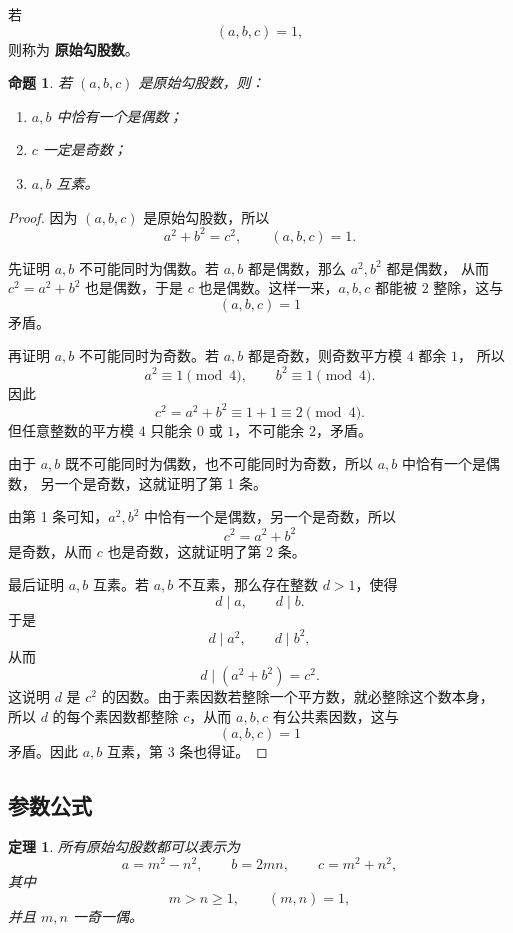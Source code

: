 \documentclass[11pt,a4paper,fontset=fandol]{ctexart}
\theoremstyle{formaltheorem}
\newtheorem{theorem}{定理}[section]
\newtheorem{proposition}{命题}[section]
\theoremstyle{formalexample}
\begin{document}
若
\[
(a,b,c)=1,
\]
则称为 \textbf{原始勾股数}。

\begin{proposition}
若 $(a,b,c)$ 是原始勾股数，则：
\begin{enumerate}
  \item $a,b$ 中恰有一个是偶数；
  \item $c$ 一定是奇数；
  \item $a,b$ 互素。
\end{enumerate}
\end{proposition}

\begin{proof}
因为 $(a,b,c)$ 是原始勾股数，所以
\[
a^2+b^2=c^2,
\qquad (a,b,c)=1.
\]

先证明 $a,b$ 不可能同时为偶数。若 $a,b$ 都是偶数，那么 $a^2,b^2$ 都是偶数，
从而 $c^2=a^2+b^2$ 也是偶数，于是 $c$ 也是偶数。这样一来，$a,b,c$ 都能被 $2$
整除，这与
\[
(a,b,c)=1
\]
矛盾。

再证明 $a,b$ 不可能同时为奇数。若 $a,b$ 都是奇数，则奇数平方模 $4$ 都余 $1$，
所以
\[
a^2\equiv 1\pmod 4,\qquad b^2\equiv 1\pmod 4.
\]
因此
\[
c^2=a^2+b^2\equiv 1+1\equiv 2\pmod 4.
\]
但任意整数的平方模 $4$ 只能余 $0$ 或 $1$，不可能余 $2$，矛盾。

由于 $a,b$ 既不可能同时为偶数，也不可能同时为奇数，所以 $a,b$ 中恰有一个是偶数，
另一个是奇数，这就证明了第 1 条。

由第 1 条可知，$a^2,b^2$ 中恰有一个是偶数，另一个是奇数，所以
\[
c^2=a^2+b^2
\]
是奇数，从而 $c$ 也是奇数，这就证明了第 2 条。

最后证明 $a,b$ 互素。若 $a,b$ 不互素，那么存在整数 $d>1$，使得
\[
d\mid a,\qquad d\mid b.
\]
于是
\[
d\mid a^2,\qquad d\mid b^2,
\]
从而
\[
d\mid (a^2+b^2)=c^2.
\]
这说明 $d$ 是 $c^2$ 的因数。由于素因数若整除一个平方数，就必整除这个数本身，
所以 $d$ 的每个素因数都整除 $c$，从而 $a,b,c$ 有公共素因数，这与
\[
(a,b,c)=1
\]
矛盾。因此 $a,b$ 互素，第 3 条也得证。
\end{proof}

\subsection{参数公式}

\begin{theorem}
所有原始勾股数都可以表示为
\[
a=m^2-n^2,\qquad b=2mn,\qquad c=m^2+n^2,
\]
其中
\[
m>n\ge 1,\qquad (m,n)=1,
\]
并且 $m,n$ 一奇一偶。
\end{theorem}
\end{document}
